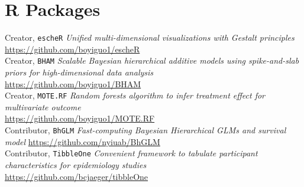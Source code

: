 \section{R Packages}
\vspace{-3ex}

    Creator, \texttt{escheR} {\it Unified multi-dimensional visualizations with Gestalt principles}\\
    \url{https://github.com/boyiguo1/escheR}\\

    
    Creator, \texttt{BHAM} {\it Scalable Bayesian hierarchical additive models using spike-and-slab  priors for high-dimensional data analysis}\\
    \url{https://github.com/boyiguo1/BHAM}\\
    
	Creator, \texttt{MOTE.RF} {\it Random forests algorithm to infer treatment effect for multivariate outcome}\\
	\url{https://github.com/boyiguo1/MOTE.RF}\\
	
	Contributor, \texttt{BhGLM} {\it Fast-computing Bayesian Hierarchical GLMs and survival model}
	\url{https://github.com/nyiuab/BhGLM}\\
	
	Contributor, \texttt{TibbleOne} {\it Convenient framework to tabulate participant characteristics for epidemiology studies}\\
	\url{https://github.com/bcjaeger/tibbleOne}\\
